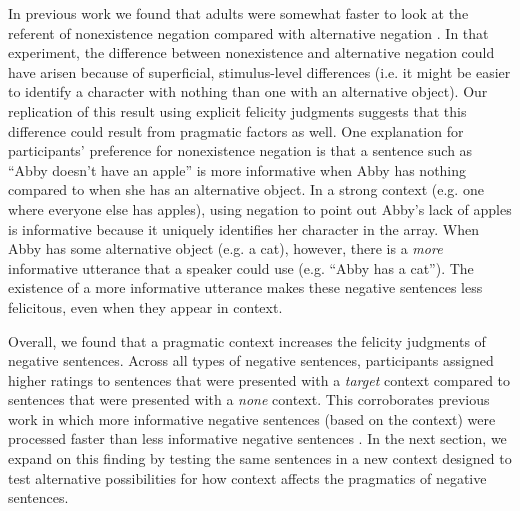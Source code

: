 \documentclass[10pt,letterpaper]{article}
\begin{document}
In previous work we found that adults were somewhat faster to look at the referent of nonexistence negation compared with alternative negation \cite{nordmeyer2014b}. In that experiment, the difference between nonexistence and alternative negation could have arisen because of superficial, stimulus-level differences (i.e. it might be easier to identify a character with nothing than one with an alternative object). Our replication of this result using explicit felicity judgments suggests that this difference could result from pragmatic factors as well. One explanation for participants' preference for nonexistence negation is that a sentence such as ``Abby doesn't have an apple'' is more informative when Abby has nothing compared to when she has an alternative object.  In a strong context (e.g. one where everyone else has apples), using negation to point out Abby's lack of apples is informative because it uniquely identifies her character in the array.  When Abby has some alternative object (e.g. a cat), however, there is a \emph{more} informative utterance that a speaker could use (e.g. ``Abby has a cat'').  The existence of a more informative utterance makes these negative sentences less felicitous, even when they appear in context.

Overall, we found that a pragmatic context increases the felicity judgments of negative sentences.  Across all types of negative sentences, participants assigned higher ratings to sentences that were presented with a \emph{target} context compared to sentences that were presented with a \emph{none} context.  This corroborates previous work in which more informative negative sentences (based on the context) were processed faster than less informative negative sentences \cite{nordmeyer2014}.  In the next section, we expand on this finding by testing the same sentences in a new context designed to test alternative possibilities for how context affects the pragmatics of negative sentences.
\end{document}
